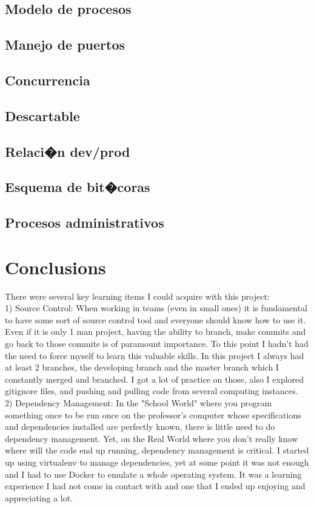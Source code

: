 \documentclass[10pt]{article}
\begin{document}
 \subsection{Modelo de procesos}
 \subsection{Manejo de puertos}
 \subsection{Concurrencia}
 \subsection{Descartable}
 \subsection{Relaci�n dev/prod}
 \subsection{Esquema de bit�coras}
 \subsection{Procesos administrativos}
\section{Conclusions}
There were several key learning items I could acquire with this project:\\

1) Source Control: When working in teams (even in small ones) it is fundamental to have some sort of source control tool and everyone should know how to use it. Even if it is only 1 man project, having the ability to branch, make commits and go back to those commits is of paramount importance. To this point I hadn't had the need to force myself to learn this valuable skills. In this project I always had at least 2 branches, the developing branch and the master branch which I constantly merged and branched. I got a lot of practice on those, also I explored gitignore files, and pushing and pulling code from several computing instances.\\

2) Dependency Management: In the "School World" where you program something once to be run once on the professor's computer whose specifications and dependencies installed are perfectly known, there is little need to do dependency management. Yet, on the Real World where you don't really know where will the code end up running, dependency management is critical. I started up using virtualenv to manage dependencies, yet at some point it was not enough and I had to use Docker to emulate a whole operating system. It was a learning experience I had not come in contact with and one that I ended up enjoying and appreciating a lot.\\
\end{document}
